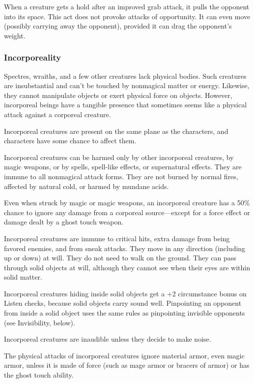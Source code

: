 When a creature gets a hold after an improved grab attack, it pulls the opponent into its space. This act does not provoke attacks of opportunity. It can even move (possibly carrying away the opponent), provided it can drag the opponent's weight.

\subsubsection{Incorporeality}
Spectres, wraiths, and a few other creatures lack physical bodies. Such creatures are insubstantial and can't be touched by nonmagical matter or energy. Likewise, they cannot manipulate objects or exert physical force on objects. However, incorporeal beings have a tangible presence that sometimes seems like a physical attack against a corporeal creature.

Incorporeal creatures are present on the same plane as the characters, and characters have some chance to affect them.

Incorporeal creatures can be harmed only by other incorporeal creatures, by magic weapons, or by spells, spell-like effects, or supernatural effects. They are immune to all nonmagical attack forms. They are not burned by normal fires, affected by natural cold, or harmed by mundane acids.

Even when struck by magic or magic weapons, an incorporeal creature has a 50\% chance to ignore any damage from a corporeal source---except for a force effect or damage dealt by a ghost touch weapon.

Incorporeal creatures are immune to critical hits, extra damage from being favored enemies, and from sneak attacks. They move in any direction (including up or down) at will. They do not need to walk on the ground. They can pass through solid objects at will, although they cannot see when their eyes are within solid matter.

Incorporeal creatures hiding inside solid objects get a +2 circumstance bonus on Listen checks, because solid objects carry sound well. Pinpointing an opponent from inside a solid object uses the same rules as pinpointing invisible opponents (see Invisibility, below).

Incorporeal creatures are inaudible unless they decide to make noise.

The physical attacks of incorporeal creatures ignore material armor, even magic armor, unless it is made of force (such as mage armor or bracers of armor) or has the ghost touch ability.

